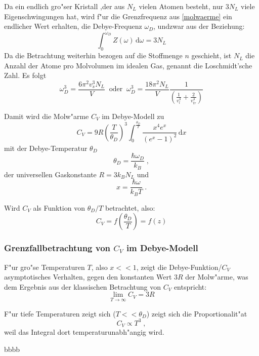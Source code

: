     Da ein endlich gro"ser Kristall ,der aus $N_L$ vielen Atomen besteht, nur $3N_L$ viele Eigenschwingungen hat, wird f"ur die Grenzfrequenz aus \ref{molwaerme} ein endlicher Wert erhalten, die Debye-Frequenz $\omega_D$, undzwar aus der Beziehung:
    \begin{equation}
      \int_{0}^{\omega_D} Z(\omega) \, \text{d}\omega = 3N_L
    \end{equation}
    Da die Betrachtung weiterhin bezogen auf die Stoffmenge $n$ geschieht, ist $N_L$ die Anzahl der Atome pro Molvolumen im idealen Gas, genannt die Loschmidt'sche Zahl.
    Es folgt
    \begin{equation}
      \omega_D^3 = \frac{6\pi^2 v_s^3 N_L}{V} \; \; \text{oder} \; \; \omega_D^3 = \frac{18\pi^2 N_L}{V} \frac{1}{\left( \frac{1}{v_l^3}  + \frac{2}{v_{tr}^3} \right)}
    \end{equation}

    Damit wird die Molw"arme $C_V$ im Debye-Modell zu
    \begin{equation}
      C_V = 9R \left( \frac{T}{\theta_D} \right)^3 \int_{0}^{\frac{\theta_D}{T}} \frac{x^4 e^x}{\left( e^x -1 \right)^2} \, \text{d}x
      \label{molwaerme debye}
    \end{equation}
    mit der Debye-Temperatur $\theta_D$
    \begin{equation}
      \theta_D = \frac{\hbar \omega_D}{k_B} \; ,
    \end{equation}
    der universellen Gaskonstante $R=3k_B N_L$ und
    \begin{equation}
      x = \frac{\hbar \omega}{k_B T} \; .
    \end{equation}

    Wird $C_V$ als Funktion von $\theta_D/T$ betrachtet, also:
    \begin{equation}
      C_V = f\left( \frac{\theta_D}{T} \right) = f(z)
    \end{equation}


    \subsubsection{Grenzfallbetrachtung von $C_V$ im Debye-Modell}
      F"ur gro"se Temperaturen $T$, also $x<<1$, zeigt die Debye-Funktion/$C_V$  asymptotisches Verhalten, gegen den konstanten Wert $3R$ der Molw"arme, was dem Ergebnis aus der klassischen Betrachtung von $C_V$ entspricht:
      \begin{equation}
        \lim\limits_{T \to \infty}{C_V} = 3R
      \end{equation}

      F"ur tiefe Temperaturen zeigt sich ($T<<\theta_D$) zeigt sich die Proportionalit"at
      \begin{equation}
        C_V \propto T^3 \; ,
      \end{equation}
      weil das Integral dort temperaturunabh"angig wird.



























bbbb
